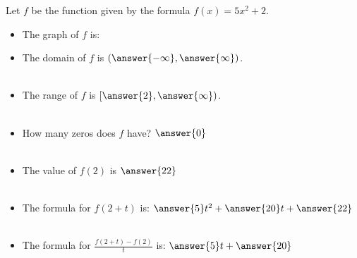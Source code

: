 \documentclass{ximera}
\author{Bobby Ramsey}
\begin{document}
Let $f$ be the function given by the formula $f(x) = 5x^2+2$.

\begin{exercise}

	\begin{itemize}
		\item The graph of $f$ is:
			\begin{multipleChoice}
			\end{multipleChoice}
		\item The domain of $f$ is $\left( \answer{-\infty}, \answer{\infty} \right)$. \\ \\
		\item The range of $f$ is $\left[ \answer{2}, \answer{\infty} \right)$. \\ \\
		\item How many zeros does $f$ have? $\answer{0}$\\ \\
		\item The value of $f(2)$ is $\answer{22}$\\ \\
		\item The formula for $f( 2+t )$ is: $\answer{5}t^2 + \answer{20}t + \answer{22}$\\ \\
		\item The formula for $\frac{f( 2+t ) - f(2)}{t}$ is: $\answer{5}t+\answer{20}$\\ \\
	\end{itemize}
	
\end{exercise}
\end{document}

